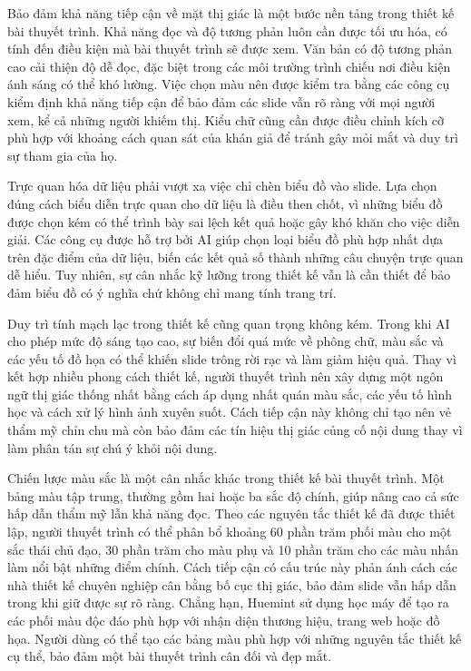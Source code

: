 Bảo đảm khả năng tiếp cận về mặt thị giác là một bước nền tảng trong thiết kế bài thuyết trình. Khả năng đọc và độ tương phản luôn cần được tối ưu hóa, có tính đến điều kiện mà bài thuyết trình sẽ được xem. Văn bản có độ tương phản cao cải thiện độ dễ đọc, đặc biệt trong các môi trường trình chiếu nơi điều kiện ánh sáng có thể khó lường. Việc chọn màu nên được kiểm tra bằng các công cụ kiểm định khả năng tiếp cận để bảo đảm các slide vẫn rõ ràng với mọi người xem, kể cả những người khiếm thị. Kiểu chữ cũng cần được điều chỉnh kích cỡ phù hợp với khoảng cách quan sát của khán giả để tránh gây mỏi mắt và duy trì sự tham gia của họ.

Trực quan hóa dữ liệu phải vượt xa việc chỉ chèn biểu đồ vào slide. Lựa chọn đúng cách biểu diễn trực quan cho dữ liệu là điều then chốt, vì những biểu đồ được chọn kém có thể trình bày sai lệch kết quả hoặc gây khó khăn cho việc diễn giải. Các công cụ được hỗ trợ bởi AI giúp chọn loại biểu đồ phù hợp nhất dựa trên đặc điểm của dữ liệu, biến các kết quả số thành những câu chuyện trực quan dễ hiểu. Tuy nhiên, sự cân nhắc kỹ lưỡng trong thiết kế vẫn là cần thiết để bảo đảm biểu đồ có ý nghĩa chứ không chỉ mang tính trang trí.

Duy trì tính mạch lạc trong thiết kế cũng quan trọng không kém. Trong khi AI cho phép mức độ sáng tạo cao, sự biến đổi quá mức về phông chữ, màu sắc và các yếu tố đồ họa có thể khiến slide trông rời rạc và làm giảm hiệu quả. Thay vì kết hợp nhiều phong cách thiết kế, người thuyết trình nên xây dựng một ngôn ngữ thị giác thống nhất bằng cách áp dụng nhất quán màu sắc, các yếu tố hình học và cách xử lý hình ảnh xuyên suốt. Cách tiếp cận này không chỉ tạo nên vẻ thẩm mỹ chỉn chu mà còn bảo đảm các tín hiệu thị giác củng cố nội dung thay vì làm phân tán sự chú ý khỏi nội dung.

Chiến lược màu sắc là một cân nhắc khác trong thiết kế bài thuyết trình. Một bảng màu tập trung, thường gồm hai hoặc ba sắc độ chính, giúp nâng cao cả sức hấp dẫn thẩm mỹ lẫn khả năng đọc. Theo các nguyên tắc thiết kế đã được thiết lập, người thuyết trình có thể phân bổ khoảng 60 phần trăm phối màu cho một sắc thái chủ đạo, 30 phần trăm cho màu phụ và 10 phần trăm cho các màu nhấn làm nổi bật những điểm chính. Cách tiếp cận có cấu trúc này phản ánh cách các nhà thiết kế chuyên nghiệp cân bằng bố cục thị giác, bảo đảm slide vẫn hấp dẫn trong khi giữ được sự rõ ràng. Chẳng hạn, Huemint sử dụng học máy để tạo ra các phối màu độc đáo phù hợp với nhận diện thương hiệu, trang web hoặc đồ họa. Người dùng có thể tạo các bảng màu phù hợp với những nguyên tắc thiết kế cụ thể, bảo đảm một bài thuyết trình cân đối và đẹp mắt.

